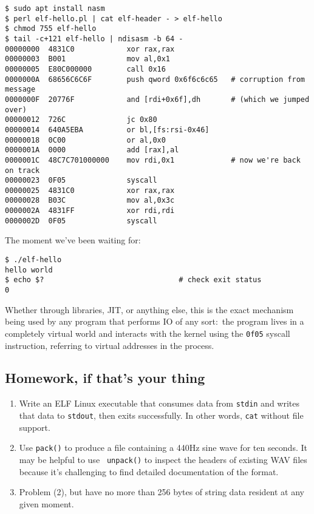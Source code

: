 \begin{verbatim}
$ sudo apt install nasm
$ perl elf-hello.pl | cat elf-header - > elf-hello
$ chmod 755 elf-hello
$ tail -c+121 elf-hello | ndisasm -b 64 -
00000000  4831C0            xor rax,rax
00000003  B001              mov al,0x1
00000005  E80C000000        call 0x16
0000000A  68656C6C6F        push qword 0x6f6c6c65   # corruption from message
0000000F  20776F            and [rdi+0x6f],dh       # (which we jumped over)
00000012  726C              jc 0x80
00000014  640A5EBA          or bl,[fs:rsi-0x46]
00000018  0C00              or al,0x0
0000001A  0000              add [rax],al
0000001C  48C7C701000000    mov rdi,0x1             # now we're back on track
00000023  0F05              syscall
00000025  4831C0            xor rax,rax
00000028  B03C              mov al,0x3c
0000002A  4831FF            xor rdi,rdi
0000002D  0F05              syscall\end{verbatim}

The moment we've been waiting for:

\begin{verbatim}
$ ./elf-hello
hello world
$ echo $?                               # check exit status
0\end{verbatim}

Whether through libraries, JIT, or anything else, this is the exact mechanism
being used by any program that performs IO of any sort:~the program lives in a
completely virtual world and interacts with the kernel using the {\tt 0f05}
syscall instruction, referring to virtual addresses in the process.

\subsection{Homework, if that's your thing}
\begin{enumerate}
  \item Write an ELF Linux executable that consumes data from {\tt stdin} and
        writes that data to {\tt stdout}, then exits successfully. In other
        words, {\tt cat} without file support.
  \item Use {\tt pack()} to produce a
         file containing a
        440Hz sine wave for ten seconds. It may be helpful to use {\tt
        unpack()} to inspect the headers of existing WAV files because it's
        challenging to find detailed documentation of the format.
  \item Problem (2), but have no more than 256 bytes of string data resident
        at any given moment.
\end{enumerate}
